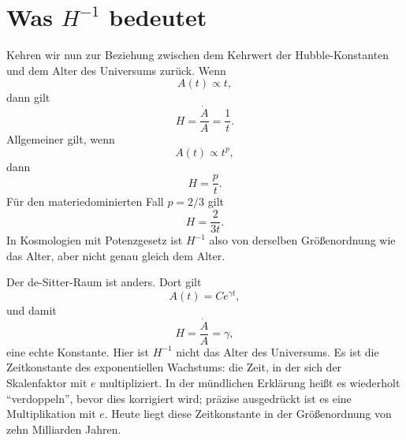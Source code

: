 \section{Was \(H^{-1}\) bedeutet}

Kehren wir nun zur Beziehung zwischen dem Kehrwert der Hubble-Konstanten und dem Alter des Universums zurück. Wenn
\begin{equation}
A(t)\propto t,
\end{equation}
dann gilt
\begin{equation}
H=\frac{\dot A}{A}=\frac{1}{t}.
\end{equation}
Allgemeiner gilt, wenn
\begin{equation}
A(t)\propto t^p,
\end{equation}
dann
\begin{equation}
H=\frac{p}{t}.
\end{equation}
Für den materiedominierten Fall \(p=2/3\) gilt
\begin{equation}
H=\frac{2}{3t}.
\end{equation}
In Kosmologien mit Potenzgesetz ist \(H^{-1}\) also von derselben Größenordnung wie das Alter, aber nicht genau gleich dem Alter.

Der de-Sitter-Raum ist anders. Dort gilt
\begin{equation}
A(t)=C e^{\gamma t},
\end{equation}
und damit
\begin{equation}
H=\frac{\dot A}{A}=\gamma,
\end{equation}
eine echte Konstante. Hier ist \(H^{-1}\) nicht das Alter des Universums. Es ist die Zeitkonstante des exponentiellen Wachstums: die Zeit, in der sich der Skalenfaktor mit \(e\) multipliziert. In der mündlichen Erklärung heißt es wiederholt ``verdoppeln'', bevor dies korrigiert wird; präzise ausgedrückt ist es eine Multiplikation mit \(e\). Heute liegt diese Zeitkonstante in der Größenordnung von zehn Milliarden Jahren.

\begin{classroomqa}
\end{classroomqa}

